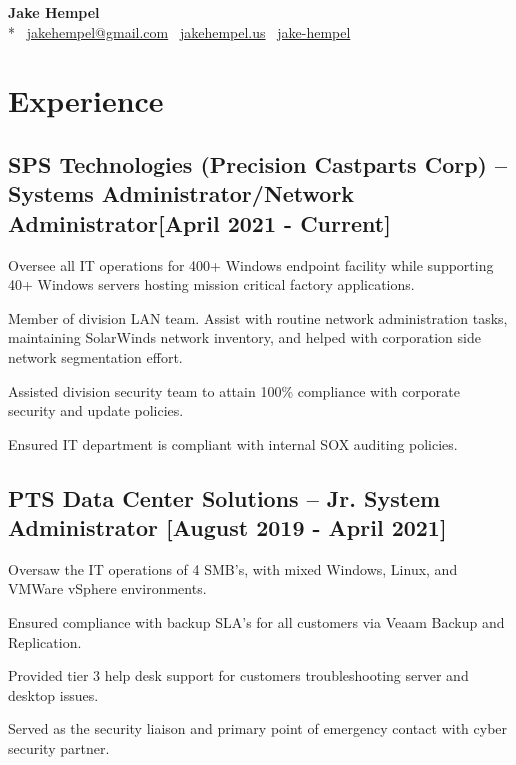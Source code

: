 \documentclass{article}
\begin{document}
\begin{samepage}
\begin{center}
\huge{\textbf{Jake Hempel}} \\*
\large{\faEnvelope \, \href{mailto:jakehempel@gmail.com}{jakehempel@gmail.com}
\faGlobe \, \href{https://jakehempel.us}{jakehempel.us}}
\faLinkedinSquare \, \href{https://www.linkedin.com/in/jake-hempel/}{jake-hempel}
\end{center}

\section{Experience}
\subsection{SPS Technologies (Precision Castparts Corp) -- Systems Administrator/Network Administrator[April 2021 - Current]}
\begin{compactitem}
	\item Oversee all IT operations for 400+ Windows endpoint facility while supporting 40+ Windows servers hosting mission critical factory applications.
	\item Member of division LAN team. Assist with routine network administration tasks, maintaining SolarWinds network inventory, and helped with corporation side network segmentation effort. 
	\item Assisted division security team to attain 100\% compliance with corporate security and update policies.
	\item Ensured IT department is compliant with internal SOX auditing policies. 
\end{compactitem}
\subsection{PTS Data Center Solutions -- Jr. System Administrator [August 2019 - April 2021]}
\begin{compactitem}
	\item Oversaw the IT operations of 4 SMB's, with mixed Windows, Linux, and VMWare vSphere environments.
	\item Ensured compliance with backup SLA's for all customers via Veaam Backup and Replication.
	\item Provided tier 3 help desk support for customers troubleshooting server and desktop issues.
 	\item Served as the security liaison and primary point of emergency contact with cyber security partner.
\end{compactitem}

\end{samepage}
\end{document}
